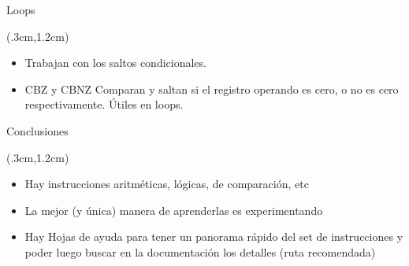 \documentclass[usenames,table,dvipsnames,aspectratio=169]{beamer}
\begin{document}
\begin{frame}{Loops}
 \begin{textblock*}{\textwidth}(.3cm,1.2cm)
  \begin{itemize}[<+->]\justifying \parskip 0.3cm
   \item Trabajan con los saltos condicionales.
   \item CBZ y CBNZ Comparan y saltan si el registro operando es cero, o no es cero respectivamente. Útiles en loops.
  \end{itemize}
 \end{textblock*}
\end{frame}

\begin{frame}{Conclusiones}
 \begin{textblock*}{\textwidth}(.3cm,1.2cm)
  \begin{itemize} \justifying \parskip 0.3cm
   \item Hay instrucciones aritméticas, lógicas, de comparación, etc
   \item La mejor (y única) manera de aprenderlas es experimentando
   \item Hay Hojas de ayuda para tener un panorama rápido del set de instrucciones y poder luego buscar en la documentación los detalles (ruta recomendada)
  \end{itemize}
 \end{textblock*}
\end{frame}
\end{document}
